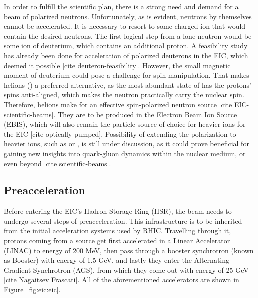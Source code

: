 In order to fulfill the scientific plan, there is a strong need and demand for a beam of polarized neutrons. Unfortunately, as is evident, neutrons by themselves cannot be accelerated. It is necessary to resort to some charged ion that would contain the desired neutrons. The first logical step from a lone neutron would be some ion of deuterium, which contains an additional proton. A feasibility study has already been done for acceleration of polarized deuterons in the EIC, which deemed it possible [cite deuteron-feasibility]. However, the small magnetic moment of deuterium could pose a challenge for spin manipulation. That makes helions () a preferred alternative, as the most abundant state of  has the protons' spins anti-aligned, which makes the neutron practically carry the nuclear spin. Therefore, helions make for an effective spin-polarized neutron source [cite EIC-scientific-beams]. They are to be produced in the Electron Beam Ion Source (EBIS), which will also remain the particle source of choice for heavier ions for the EIC [cite optically-pumped]. Possibility of extending the polarization to heavier ions, such as  or , is still under discussion, as it could prove beneficial for gaining new insights into quark-gluon dynamics within the nuclear medium, or even beyond [cite scientific-beams]. 

\subsection{Preacceleration}
Before entering the EIC's Hadron Storage Ring (HSR), the beam needs to undergo several steps of preacceleration. This infrastructure is to be inherited from the initial acceleration systems used by RHIC. Travelling through it, protons coming from a source get first accelerated in a Linear Accelerator (LINAC) to energy of 200 MeV, then pass through a booster synchrotron (known as Booster) with energy of 1.5 GeV, and lastly they enter the Alternating Gradient Synchrotron (AGS), from which they come out with energy of 25 GeV [cite Nagaitsev Frascati]. All of the aforementioned accelerators are shown in Figure~\ref{fig:eic:eic}.

